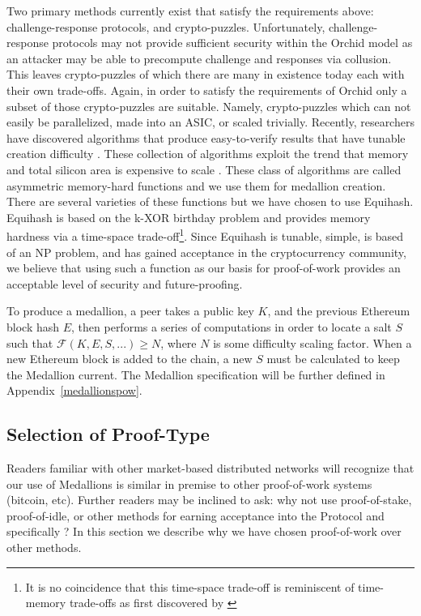 Two primary methods currently exist that satisfy the requirements above: challenge-response protocols, and crypto-puzzles. Unfortunately, challenge-response protocols may not provide sufficient security within the Orchid model as an attacker may be able to precompute challenge and responses via collusion. This leaves crypto-puzzles of which there are many in existence today \cite{nakamoto2008bitcoin, Equihash} each with their own trade-offs. Again, in order to satisfy the requirements of Orchid only a subset of those crypto-puzzles are suitable. Namely, crypto-puzzles which can not easily be parallelized, made into an ASIC, or scaled trivially. Recently, researchers have discovered algorithms that produce easy-to-verify results that have tunable creation difficulty \cite{Equihash}. These collection of algorithms exploit the trend that memory and total silicon area is expensive to scale \cite{abadi2005moderately, dwork2005pebbling}. These class of algorithms are called asymmetric memory-hard functions and we use them for medallion creation. There are several varieties of these functions \cite{tromp2014cuckoo, lorimermomentum, Equihash} but we have chosen to use Equihash. Equihash is based on the k-XOR birthday problem and provides memory hardness via a time-space trade-off\footnote{It is no coincidence that this time-space trade-off is reminiscent of time-memory trade-offs as first discovered by \cite{hellman1980cryptanalytic}}. Since Equihash is tunable, simple, is based of an NP problem, and has gained acceptance in the cryptocurrency community, we believe that using such a function as our basis for proof-of-work provides an acceptable level of security and future-proofing.

To produce a medallion, a peer takes a public key $K$, and the previous Ethereum block hash $E$, then performs a series of computations in order to locate a salt $S$ such that $\mathcal{F}(K, E, S, ...) \geq N$, where $N$ is some difficulty scaling factor. When a new Ethereum block is added to the chain, a new $S$ must be calculated to keep the Medallion current. The Medallion specification will be further defined  in Appendix~\ref{medallionspow}.

\subsection{Selection of Proof-Type}
\label{medallion-proof}

Readers familiar with other market-based distributed networks will recognize that our use of Medallions is similar in premise to other proof-of-work systems (bitcoin, etc). Further readers may be inclined to ask: why not use proof-of-stake, proof-of-idle, or other methods for earning acceptance into the \Orchid{} Protocol and specifically \tOM{}? In this section we describe why we have chosen proof-of-work over other methods.

